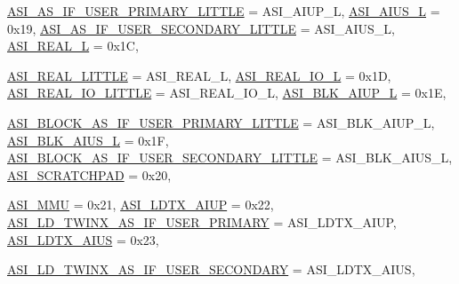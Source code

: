 \begin{DoxyCompactItemize}
\par
\hyperlink{namespaceSparcISA_a6dd43f1311515252b283f56d7095a1f3a9419a37545c8b71d7696373b3c54367f}{ASI\_\-AS\_\-IF\_\-USER\_\-PRIMARY\_\-LITTLE} =  ASI\_\-AIUP\_\-L, 
\hyperlink{namespaceSparcISA_a6dd43f1311515252b283f56d7095a1f3a94a9c7cf6474c38459703c623bba755c}{ASI\_\-AIUS\_\-L} =  0x19, 
\hyperlink{namespaceSparcISA_a6dd43f1311515252b283f56d7095a1f3ae04682d9ba1525410f5662cb8abd596e}{ASI\_\-AS\_\-IF\_\-USER\_\-SECONDARY\_\-LITTLE} =  ASI\_\-AIUS\_\-L, 
\hyperlink{namespaceSparcISA_a6dd43f1311515252b283f56d7095a1f3afca1b2aec0b9448375886600c09b46a3}{ASI\_\-REAL\_\-L} =  0x1C, 
\par
\hyperlink{namespaceSparcISA_a6dd43f1311515252b283f56d7095a1f3af3dfe20255ea687db98bd6f49f251ee3}{ASI\_\-REAL\_\-LITTLE} =  ASI\_\-REAL\_\-L, 
\hyperlink{namespaceSparcISA_a6dd43f1311515252b283f56d7095a1f3aa8cd53e6b7501463936913b4f99be9c2}{ASI\_\-REAL\_\-IO\_\-L} =  0x1D, 
\hyperlink{namespaceSparcISA_a6dd43f1311515252b283f56d7095a1f3af9e1966ffe77bbd9db1bdc1b02741552}{ASI\_\-REAL\_\-IO\_\-LITTLE} =  ASI\_\-REAL\_\-IO\_\-L, 
\hyperlink{namespaceSparcISA_a6dd43f1311515252b283f56d7095a1f3aca8f8bccb357a63a02b96aa91fa04032}{ASI\_\-BLK\_\-AIUP\_\-L} =  0x1E, 
\par
\hyperlink{namespaceSparcISA_a6dd43f1311515252b283f56d7095a1f3a39657ec7d60e1c37f59bb602ea23454e}{ASI\_\-BLOCK\_\-AS\_\-IF\_\-USER\_\-PRIMARY\_\-LITTLE} =  ASI\_\-BLK\_\-AIUP\_\-L, 
\hyperlink{namespaceSparcISA_a6dd43f1311515252b283f56d7095a1f3ab47deb5766fc9d9be340d19fe69a154a}{ASI\_\-BLK\_\-AIUS\_\-L} =  0x1F, 
\hyperlink{namespaceSparcISA_a6dd43f1311515252b283f56d7095a1f3a2c923fe0a930a58a9cb99c57afd296f7}{ASI\_\-BLOCK\_\-AS\_\-IF\_\-USER\_\-SECONDARY\_\-LITTLE} =  ASI\_\-BLK\_\-AIUS\_\-L, 
\hyperlink{namespaceSparcISA_a6dd43f1311515252b283f56d7095a1f3a25874ec8febf8f142d4c3bd62656bfa9}{ASI\_\-SCRATCHPAD} =  0x20, 
\par
\hyperlink{namespaceSparcISA_a6dd43f1311515252b283f56d7095a1f3aa3c5a664053947b87ec49c0faae2506a}{ASI\_\-MMU} =  0x21, 
\hyperlink{namespaceSparcISA_a6dd43f1311515252b283f56d7095a1f3a4bb3bab68ccaee23baa55f02e58d7beb}{ASI\_\-LDTX\_\-AIUP} =  0x22, 
\hyperlink{namespaceSparcISA_a6dd43f1311515252b283f56d7095a1f3adbd4ba5cf6efd813dadc24ebc18c212f}{ASI\_\-LD\_\-TWINX\_\-AS\_\-IF\_\-USER\_\-PRIMARY} =  ASI\_\-LDTX\_\-AIUP, 
\hyperlink{namespaceSparcISA_a6dd43f1311515252b283f56d7095a1f3aa0b7f4f35d39e83e0d94656694598dc0}{ASI\_\-LDTX\_\-AIUS} =  0x23, 
\par
\hyperlink{namespaceSparcISA_a6dd43f1311515252b283f56d7095a1f3ad84a1a5b376db736a8755068938b71d4}{ASI\_\-LD\_\-TWINX\_\-AS\_\-IF\_\-USER\_\-SECONDARY} =  ASI\_\-LDTX\_\-AIUS, 

\end{DoxyCompactItemize}
